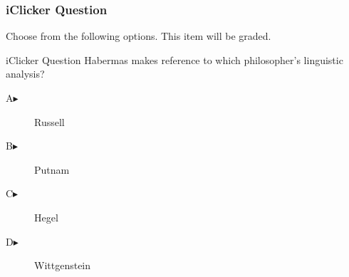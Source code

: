 \begin{frame}
  \frametitle{iClicker Question}
Choose from the following options. This item will be graded.
\begin{block}{iClicker Question}
Habermas makes reference to which philosopher's linguistic analysis?
\end{block}
\begin{description}
\item[A\hspace{.2in}$\blacktriangleright$] Russell
\item[B\hspace{.2in}$\blacktriangleright$] Putnam
\item[C\hspace{.2in}$\blacktriangleright$] Hegel
\item[D\hspace{.2in}$\blacktriangleright$] Wittgenstein
\end{description}
\end{frame}
